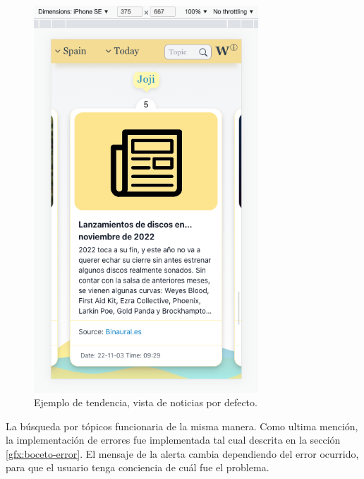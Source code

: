 \begin{figure}[H]
    \centering
    \myfloatalign
    \includegraphics[width=0.75\textwidth]{gfx/ejemplo6.png}
    \caption[Ejemplo de tendencia, vista de noticias por defecto]{Ejemplo de tendencia, vista de noticias por defecto.}\label{gfx:ejemplo6}
\end{figure}

La búsqueda por tópicos funcionaria de la misma manera. Como ultima mención, la implementación de errores fue implementada tal cual descrita en la sección \ref{gfx:boceto-error}. El mensaje de la alerta cambia dependiendo del error ocurrido, para que el usuario tenga conciencia de cuál fue el problema. 